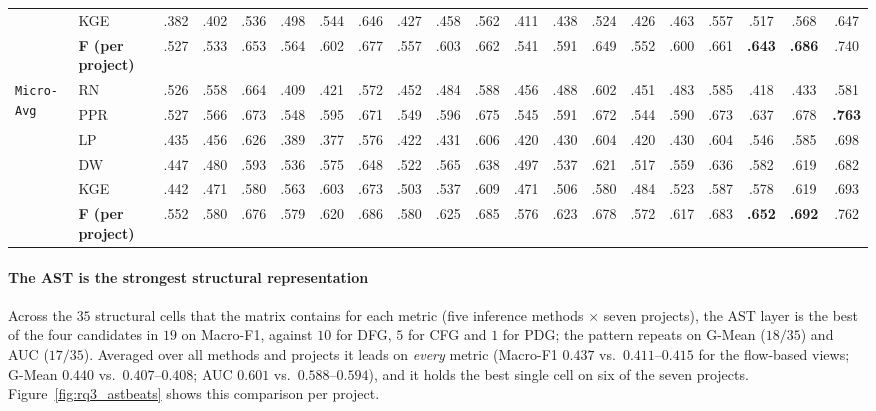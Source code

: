 \documentclass[final,5p,times,twocolumn]{elsarticle}
\theoremstyle{plain}
\begin{document}
\begin{table}[p!]
{\begin{tabular}{ll ccc ccc ccc ccc ccc ccc}
 & KGE & .382 & .402 & .536 & .498 & .544 & .646 & .427 & .458 & .562 & .411 & .438 & .524 & .426 & .463 & .557 & .517 & .568 & .647 \\
 & \textbf{F (per project)} & .527 & .533 & .653 & .564 & .602 & .677 & .557 & .603 & .662 & .541 & .591 & .649 & .552 & .600 & .661 & \textbf{.643} & \textbf{.686} & .740 \\
\midrule
\multirow{6}{*}{\texttt{Micro-Avg}} & RN & .526 & .558 & .664 & .409 & .421 & .572 & .452 & .484 & .588 & .456 & .488 & .602 & .451 & .483 & .585 & .418 & .433 & .581 \\
 & PPR & .527 & .566 & .673 & .548 & .595 & .671 & .549 & .596 & .675 & .545 & .591 & .672 & .544 & .590 & .673 & .637 & .678 & \textbf{.763} \\
 & LP & .435 & .456 & .626 & .389 & .377 & .576 & .422 & .431 & .606 & .420 & .430 & .604 & .420 & .430 & .604 & .546 & .585 & .698 \\
 & DW & .447 & .480 & .593 & .536 & .575 & .648 & .522 & .565 & .638 & .497 & .537 & .621 & .517 & .559 & .636 & .582 & .619 & .682 \\
 & KGE & .442 & .471 & .580 & .563 & .603 & .673 & .503 & .537 & .609 & .471 & .506 & .580 & .484 & .523 & .587 & .578 & .619 & .693 \\
 & \textbf{F (per project)} & .552 & .580 & .676 & .579 & .620 & .686 & .580 & .625 & .685 & .576 & .623 & .678 & .572 & .617 & .683 & \textbf{.652} & \textbf{.692} & .762 \\
\bottomrule
\end{tabular}
}
\end{table}

\paragraph{The AST is the strongest structural representation}
Across the $35$ structural cells that the matrix contains for each metric (five
inference methods $\times$ seven projects), the AST layer is the best of the four
candidates in $19$ on Macro-F1, against $10$ for DFG, $5$ for CFG and $1$ for PDG;
the pattern repeats on G-Mean ($18/35$) and AUC ($17/35$). Averaged over all methods
and projects it leads on \emph{every} metric (Macro-F1 $0.437$ vs.\ $0.411$--$0.415$
for the flow-based views; G-Mean $0.440$ vs.\ $0.407$--$0.408$; AUC $0.601$ vs.\
$0.588$--$0.594$), and it holds the best single cell on six of the seven projects.
Figure~\ref{fig:rq3_astbeats} shows this comparison per project.
\end{document}
